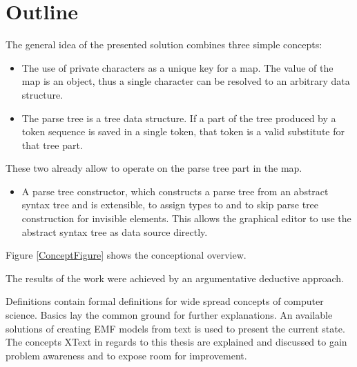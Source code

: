 \section{Outline}
The general idea of the presented solution combines three simple concepts:
\begin{itemize}
	\item The use of private characters as a unique key for a map. The value of the map is an object, thus a single character can be resolved to an arbitrary data structure.
	\item The parse tree is a tree data structure. If a part of the tree produced by a token sequence is saved in a single token, that token is a valid substitute for that tree part.
\end{itemize}
These two already allow to operate on the parse tree part in the map.
\begin{itemize}
	\item A parse tree constructor, which constructs a parse tree from an abstract syntax tree and is extensible, to assign types to and to skip parse tree construction for invisible elements. This allows the graphical editor to use the abstract syntax tree as data source directly. 
\end{itemize}

Figure \ref{ConceptFigure} shows the conceptional overview. 

The results of the work were achieved by an argumentative deductive approach. 



Definitions contain formal definitions for wide spread concepts of computer science. Basics lay the common ground for further explanations. An available solutions of creating EMF models from text is used to present the current state. The concepts XText in regards to this thesis are explained and discussed to gain problem awareness and to expose room for improvement. 

